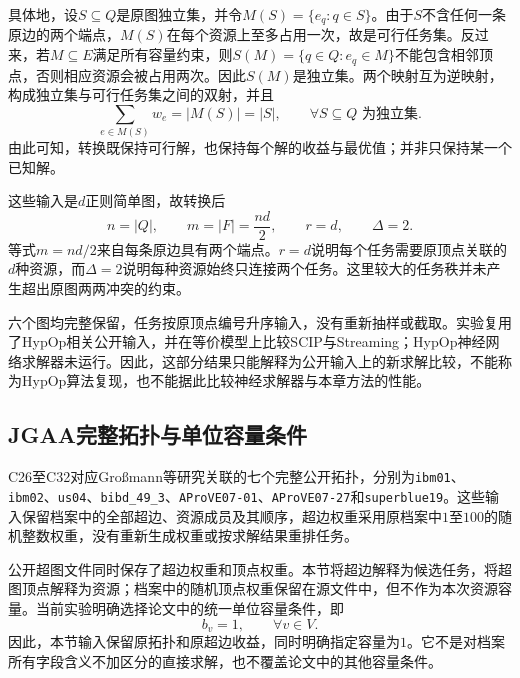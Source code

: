 具体地，设$S\subseteq Q$是原图独立集，并令$M(S)=\{e_q:q\in S\}$。由于$S$不含任何一条原边的两个端点，$M(S)$在每个资源上至多占用一次，故是可行任务集。反过来，若$M\subseteq E$满足所有容量约束，则$S(M)=\{q\in Q:e_q\in M\}$不能包含相邻顶点，否则相应资源会被占用两次。因此$S(M)$是独立集。两个映射互为逆映射，构成独立集与可行任务集之间的双射，并且
\begin{equation}
 \sum_{e\in M(S)}w_e=|M(S)|=|S|,
 \qquad \forall S\subseteq Q\text{ 为独立集}.
 \label{s0305:mis_objective}
\end{equation}
由此可知，转换既保持可行解，也保持每个解的收益与最优值；并非只保持某一个已知解。

这些输入是$d$正则简单图，故转换后
\begin{equation}
 n=|Q|,\qquad m=|F|=\frac{nd}{2},\qquad
 r=d,\qquad\Delta=2.
 \label{s0305:mis_sizes}
\end{equation}
等式$m=nd/2$来自每条原边具有两个端点。$r=d$说明每个任务需要原顶点关联的$d$种资源，而$\Delta=2$说明每种资源始终只连接两个任务。这里较大的任务秩并未产生超出原图两两冲突的约束。

六个图均完整保留，任务按原顶点编号升序输入，没有重新抽样或截取。实验复用了HypOp相关公开输入，并在等价模型上比较SCIP与Streaming；HypOp神经网络求解器未运行。因此，这部分结果只能解释为公开输入上的新求解比较，不能称为HypOp算法复现，也不能据此比较神经求解器与本章方法的性能。

\subsection{JGAA完整拓扑与单位容量条件}

C26至C32对应Großmann等研究关联的七个完整公开拓扑\cite{GrossmannJRS2026}，分别为\texttt{ibm01}、\texttt{ibm02}、\texttt{us04}、\texttt{bibd\_49\_3}、\texttt{AProVE07-01}、\texttt{AProVE07-27}和\texttt{superblue19}。这些输入保留档案中的全部超边、资源成员及其顺序，超边权重采用原档案中$1$至$100$的随机整数权重，没有重新生成权重或按求解结果重排任务。

公开超图文件同时保存了超边权重和顶点权重。本节将超边解释为候选任务，将超图顶点解释为资源；档案中的随机顶点权重保留在源文件中，但不作为本次资源容量。当前实验明确选择论文中的统一单位容量条件，即
\begin{equation}
 b_v=1,\qquad \forall v\in V.
 \label{s0305:public_capacity}
\end{equation}
因此，本节输入保留原拓扑和原超边收益，同时明确指定容量为$1$。它不是对档案所有字段含义不加区分的直接求解，也不覆盖论文中的其他容量条件。

